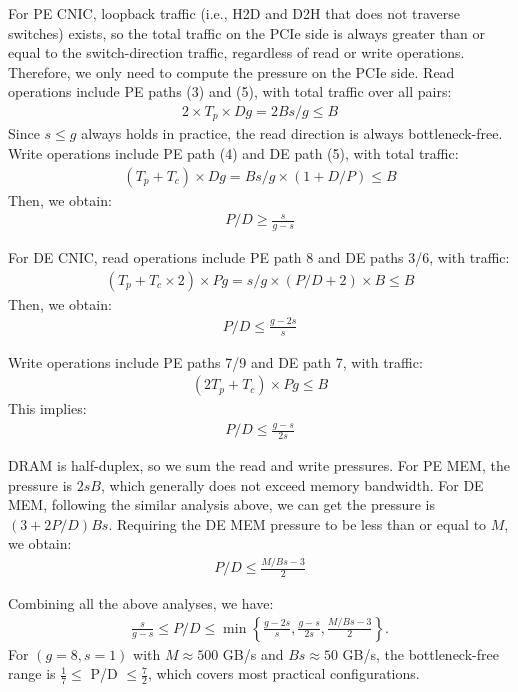 For PE CNIC, loopback traffic (i.e., H2D and D2H that does not traverse switches) exists, so the total traffic on the PCIe side is always greater than or equal to the switch-direction traffic, regardless of read or write operations.
Therefore, we only need to compute the pressure on the PCIe side.
Read operations include PE paths (3) and (5), with total traffic over all pairs:
\begin{align}
2\times T_p \times Dg = 2Bs/g \leq B
\end{align}
Since $s\leq g$ always holds in practice, the read direction is always bottleneck-free.
Write operations include PE path (4) and DE path (5), with total traffic:
\begin{align}
(T_p + T_c) \times Dg = Bs/g \times (1 + D/P) \leq B
\end{align}
Then, we obtain:
\begin{align}
P/D \geq \frac{s}{g-s}
\end{align}

For DE CNIC, read operations include PE path 8 and DE paths 3/6, with traffic:
\begin{align}
(T_p + T_c \times 2) \times Pg = s/g\times (P/D+2) \times B \leq B
\end{align}
Then, we obtain:
\begin{align}
P/D \leq \frac{g-2s}{s}
\end{align}

Write operations include PE paths 7/9 and DE path 7, with traffic:
\begin{align}
(2T_p + T_c) \times Pg \leq B
\end{align}
This implies:
\begin{align}
P/D \leq \frac{g-s}{2s}
\end{align}

DRAM is half-duplex, so we sum the read and write pressures.
For PE MEM, the pressure is $2sB$, which generally does not exceed memory bandwidth.
For DE MEM, following the similar analysis above, we can get the pressure is $(3 + 2P/D) Bs$.
Requiring the DE MEM pressure to be less than or equal to $M$, we obtain:
\begin{align}
P/D \leq \frac{M/Bs - 3}{2}
\end{align}

 Combining all the above analyses, we have:
\begin{align}
\frac{s}{g-s} \leq P/D \leq \min\left\{\frac{g-2s}{s}, \frac{g-s}{2s}, \frac{M/Bs - 3}{2}\right\}.
\end{align}
For $(g=8, s=1)$ with $M \approx 500$ GB/s and $Bs \approx 50$ GB/s, the bottleneck-free range is $\frac{1}{7} \leq$ P/D $\leq \frac{7}{2}$, which covers most practical configurations.


